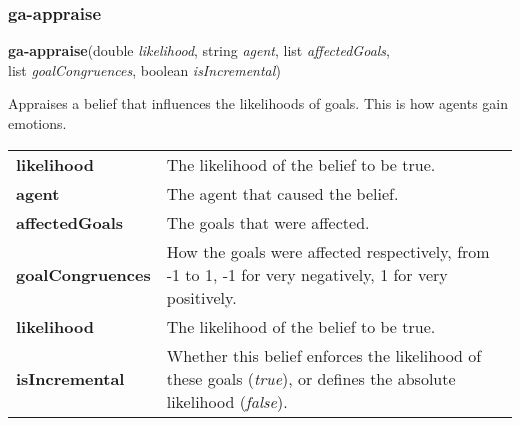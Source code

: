 \subsubsection{ga-appraise}

\textbf{ga-appraise}(double \emph{likelihood}, string \emph{agent}, list \emph{affectedGoals},\\list \emph{goalCongruences}, boolean \emph{isIncremental})\vspace{.5em}

\hspace{-\parindent}Appraises a belief that influences the likelihoods of goals. This is how agents gain emotions.\\[.4em]

\noindent
\begin{tabularx}{\textwidth}{@{}p{4cm} X}
	\textbf{likelihood} & The likelihood of the belief to be true.\\
	\textbf{agent} & The agent that caused the belief. \\
	\textbf{affectedGoals} & The goals that were affected.\\
	\textbf{goalCongruences} & How the goals were affected respectively, from -1 to 1, -1 for very negatively, 1 for very positively. \\
	\textbf{likelihood} & The likelihood of the belief to be true.\\
	\textbf{isIncremental} & Whether this belief enforces the likelihood of these goals (\textit{true}), or defines the absolute likelihood (\textit{false}). 
\end{tabularx}